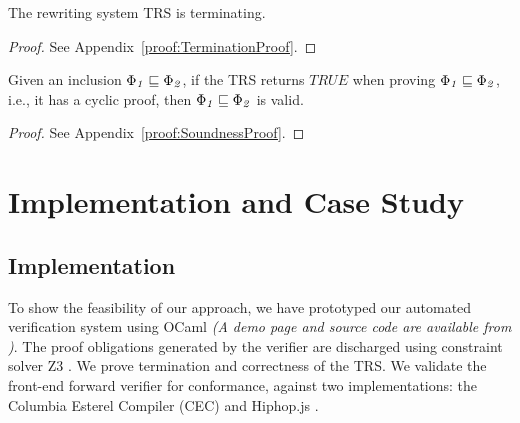 \documentclass[acmsmall,10pt,review]{acmart}
\newcommand{\effect}{\textcolor{black}{\ensuremath{\mathrm{\Phi}}}}
\newcommand{\code}[1]{{\tt{\ensuremath{\m{#1}}}}}
\newcommand{\CONTAIN}{\sqsubseteq}
\newcommand{\m}{\mathit}
\newcommand\appref[1]{Appendix~\textcolor{blue}{\ref{#1}}}
\begin{document}
{






 
\begin{theorem}[Termination]\label{termination}
The rewriting system TRS is terminating.
\end{theorem}
\begin{proof}
See %
\appref{proof:TerminationProof}.
\end{proof}

 \begin{theorem}[Soundness]\label{Cyclicsoundness}
Given an inclusion \code{\effect_1 \CONTAIN \effect_2}, if the TRS returns \code{TRUE} when proving \code{\effect_1 \CONTAIN \effect_2}, i.e., it has a cyclic proof, 
then \code{\effect_1 \CONTAIN \effect_2} is valid.
\end{theorem}


\begin{proof}
See %
\appref{proof:SoundnessProof}.
\end{proof}






\section{Implementation and Case Study}
\label{sec:Evaluation}

\subsection{Implementation}
To show the feasibility of our approach, we have prototyped our automated verification system 
using OCaml \emph{(A demo page  and source code are available from \cite{CODE})}. 
The proof obligations generated by the verifier are discharged using constraint solver Z3 \citep{de2008z3}. 
We prove termination and correctness of the TRS. We validate the front-end forward verifier for conformance, against two implementations: the Columbia Esterel Compiler (CEC) 
\cite{CEC} and Hiphop.js \cite{HH_im}. 


}
\end{document}
